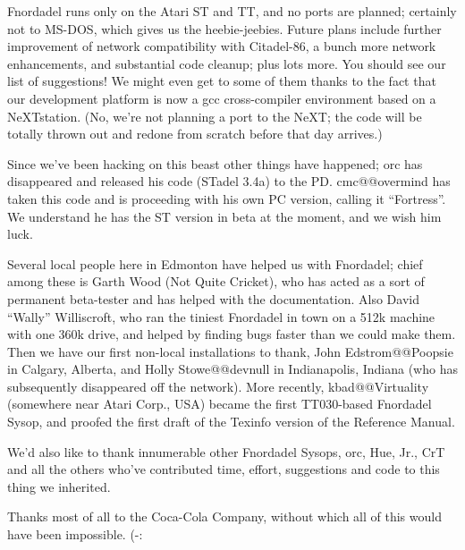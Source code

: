 Fnordadel runs only on the Atari ST and TT, and no ports are planned;
certainly not to MS-DOS, which gives us the heebie-jeebies.  Future
plans include further improvement of network compatibility with
Citadel-86, a bunch more network enhancements, and substantial code
cleanup; plus lots more.  You should see our list of
suggestions!  We might even get to some of them thanks to the fact
that our development platform is now a gcc cross-compiler environment
based on a NeXTstation.  (No, we're not planning a port to the NeXT;
the code will be totally thrown out and redone from scratch before
that day arrives.)

Since we've been hacking on this beast other things have happened;
orc has disappeared and released his code (STadel 3.4a) to the PD.
cmc@@overmind has taken this code and is proceeding with his own PC
version, calling it ``Fortress''.  We understand he has the ST version in
beta at the moment, and we wish him luck.

Several local people here in Edmonton have helped us with Fnordadel;
chief among these is Garth Wood (Not Quite Cricket), who has
acted as a sort of permanent beta-tester and has helped with the
documentation.  Also David ``Wally'' Williscroft, who ran the tiniest
Fnordadel in town on a 512k machine with one 360k drive, and helped by
finding bugs faster than we could make them.  Then we have our first
non-local installations to thank, John Edstrom@@Poopsie in Calgary,
Alberta, and Holly Stowe@@devnull in Indianapolis, Indiana (who has
subsequently disappeared off the network).  More recently,
kbad@@Virtuality (somewhere near Atari Corp., USA) became the first
TT030-based Fnordadel Sysop, and proofed the first draft of the Texinfo
version of the Reference Manual.

We'd also like to thank innumerable other Fnordadel Sysops, orc,
Hue, Jr., CrT and all the others who've contributed
time, effort, suggestions and code to this thing we inherited.

Thanks most of all to the Coca-Cola Company, without which all of this
would have been impossible. (-:
